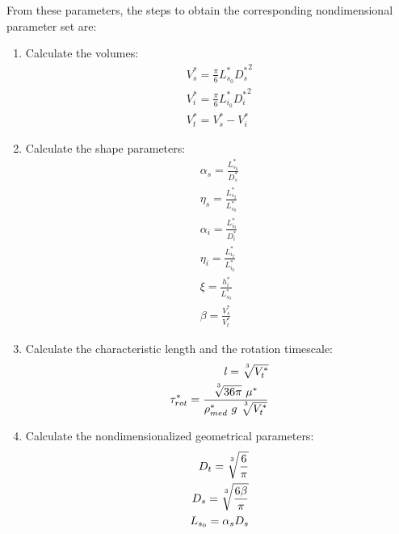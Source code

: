 \documentclass[10pt,a4paper]{article}
\def\non{\nonumber}
\def\l{\mathit{l}}
\begin{document}
From these parameters, the steps to obtain the corresponding nondimensional parameter set are:
\begin{enumerate}
	\item Calculate the volumes:
	\begin{eqnarray}\label{d2ndpars2}
		V_s^* = \frac{\pi}{6} L_{s_0}^* {D_s^*}^2 \non \\
		V_i^* = \frac{\pi}{6} L_{i_0}^* {D_i^*}^2 \non \\
		V_t^* = V_s^* - V_i^* 
	\end{eqnarray}
	\item Calculate the shape parameters: %
	\begin{eqnarray}\label{d2ndpars1}
		\alpha_s = \frac{L^*_{s_0}}{D^*_s} \non \\
		\eta_s = \frac{L^*_{s_2}}{L^*_{s_0}} \non \\
		\alpha_{i} = \frac{L^*_{i_0}}{D^*_i} \non \\
		\eta_{i} = \frac{L^*_{i_2}}{L^*_{i_0}} \non \\
		\xi = \frac{h_i^*}{L_{s_0}^*} \non \\
		\beta = \frac{V_s^*}{V_t^*}
	\end{eqnarray}
	\item Calculate the characteristic length and the rotation timescale:
	\begin{eqnarray}\label{d2ndpars3}
		\l = \sqrt[\uproot{5}3]{V_t^*} \non \\
		\tau^*_{rot} = \frac{\sqrt[\uproot{5}3]{36 \pi} ~ \mu^*}{\rho^*_{med} ~ g ~ \sqrt[\uproot{5}3]{V_t^*}}
	\end{eqnarray}
	\item Calculate the nondimensionalized geometrical parameters:
	\begin{eqnarray}\label{d2ndpars4a}
		D_t = \sqrt[\uproot{5}3]{\frac{6}{\pi}} \non \\
		D_s = \sqrt[\uproot{5}3]{\frac{6 \beta}{\pi}} \non \\
		L_{s_0} = \alpha_s D_s \non \\

\end{eqnarray}
\end{enumerate}
\end{document}
